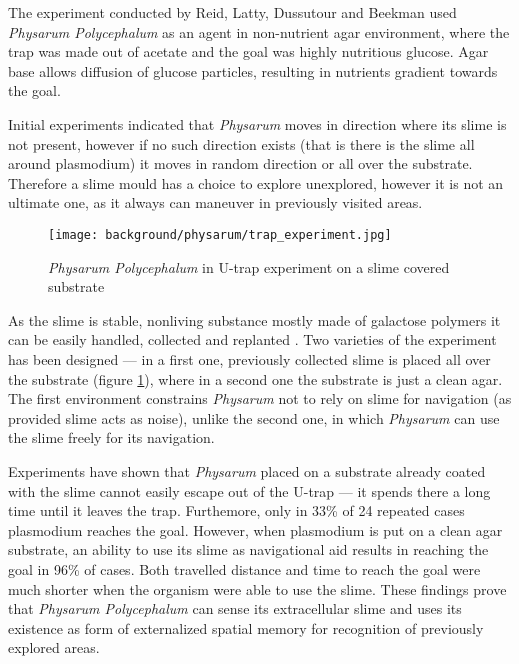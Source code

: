 The experiment conducted by Reid, Latty, Dussutour and Beekman \cite{reid2012slime} used \textit{Physarum Polycephalum} as an agent in non-nutrient agar environment, where the trap was made out of acetate and the goal was highly nutritious glucose. Agar base allows diffusion of glucose particles, resulting in nutrients gradient towards the goal.

Initial experiments indicated that \textit{Physarum} moves in direction where its slime is not present, however if no such direction exists (that is there is the slime all around plasmodium) it moves in random direction or all over the substrate. Therefore a slime mould has a choice to explore unexplored, however it is not an ultimate one, as it always can maneuver in previously visited areas. 

\begin{figure}
  \centering
  \texttt{[image: background/physarum/trap\_experiment.jpg]}
  \caption{\textit{Physarum Polycephalum} in U-trap experiment on a slime covered substrate \cite{reid2012slime}}
  \label{figure:bp_trap_experiment}
\end{figure}

As the slime is stable, nonliving substance mostly made of galactose polymers it can be easily handled, collected and replanted \cite{mccormick1970isolation}. Two varieties of the experiment has been designed --- in a first one, previously collected slime is placed all over the substrate (figure \ref{figure:bp_trap_experiment}), where in a second one the substrate is just a clean agar. The first environment constrains \textit{Physarum} not to rely on slime for navigation (as provided slime acts as noise), unlike the second one, in which \textit{Physarum} can use the slime freely for its navigation.

Experiments have shown that \textit{Physarum} placed on a substrate already coated with the slime cannot easily escape out of the U-trap --- it spends there a long time until it leaves the trap. Furthemore, only in 33\% of 24 repeated cases plasmodium reaches the goal. However, when plasmodium is put on a clean agar substrate, an ability to use its slime as navigational aid results in reaching the goal in 96\% of cases. Both travelled distance and time to reach the goal were much shorter when the organism were able to use the slime. These findings prove that \textit{Physarum Polycephalum} can sense its extracellular slime and uses its existence as form of externalized spatial memory for recognition of previously explored areas.


